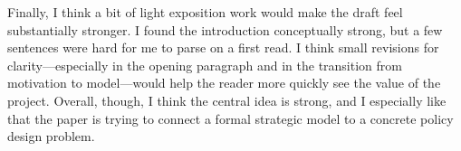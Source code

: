 \documentclass[12pt]{article}
\begin{document}
Finally, I think a bit of light exposition work would make the draft feel substantially stronger. I found the introduction conceptually strong, but a few sentences were hard for me to parse on a first read. I think small revisions for clarity---especially in the opening paragraph and in the transition from motivation to model---would help the reader more quickly see the value of the project. Overall, though, I think the central idea is strong, and I especially like that the paper is trying to connect a formal strategic model to a concrete policy design problem.
\end{document}
